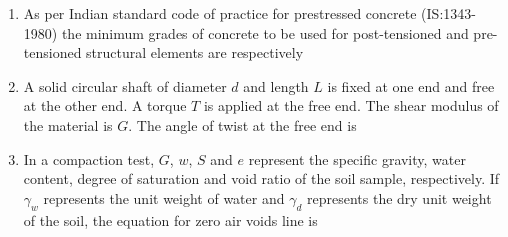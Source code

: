\documentclass[journal,12pt,onecolumn]{IEEEtran}
\theoremstyle{remark}
\begin{document}
\begin{enumerate}
\raggedright
\noindent\item As per Indian standard code of practice for prestressed concrete (IS:1343-1980) the minimum grades of concrete to be used for post-tensioned and pre-tensioned structural elements are respectively 
\hfill{}
\begin{enumerate}
\end{enumerate}
\noindent\item A solid circular shaft of diameter $d$ and length $L$ is fixed at one end and free at the other end. A torque $T$ is applied at the free end. The shear modulus of the material is $G$. The angle of twist at the free end is 
\hfill{}
\begin{enumerate}
\end{enumerate}
\noindent\item In a compaction test, $G$, $w$, $S$ and $e$ represent the specific gravity, water content, degree of saturation and void ratio of the soil sample, respectively. If $\gamma_w$ represents the unit weight of water and $\gamma_d$ represents the dry unit weight of the soil, the equation for zero air voids line is 
\\ \hfill{}
\begin{enumerate}
\end{enumerate}
\end{enumerate}
\end{document}
